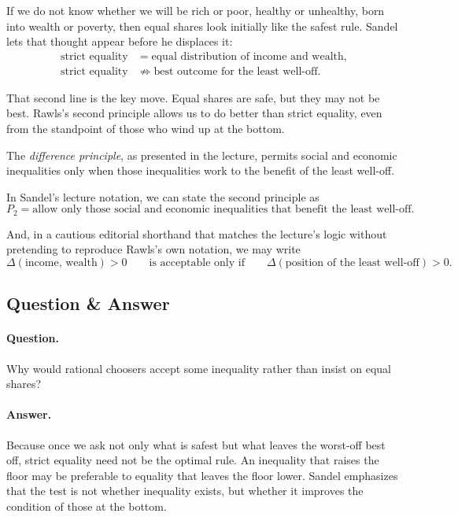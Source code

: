If we do not know whether we will be rich or poor, healthy or unhealthy, born into wealth or poverty, then equal shares look initially like the safest rule. Sandel lets that thought appear before he displaces it:
\begin{align}
\text{strict equality} &= \text{equal distribution of income and wealth},\\
\text{strict equality} &\not\Longrightarrow \text{best outcome for the least well-off}.
\end{align}

That second line is the key move. Equal shares are safe, but they may not be best. Rawls's second principle allows us to do better than strict equality, even from the standpoint of those who wind up at the bottom.

\begin{definition}
The \emph{difference principle}, as presented in the lecture, permits social and economic inequalities only when those inequalities work to the benefit of the least well-off.
\end{definition}

In Sandel's lecture notation, we can state the second principle as
\begin{equation}
P_2=\text{allow only those social and economic inequalities that benefit the least well-off}.
\end{equation}

And, in a cautious editorial shorthand that matches the lecture's logic without pretending to reproduce Rawls's own notation, we may write
\begin{equation}
\Delta(\text{income, wealth})>0
\qquad\text{is acceptable only if}\qquad
\Delta(\text{position of the least well-off})>0.
\end{equation}

\subsection{Question \& Answer}

\paragraph{Question.} Why would rational choosers accept some inequality rather than insist on equal shares?

\paragraph{Answer.} Because once we ask not only what is safest but what leaves the worst-off best off, strict equality need not be the optimal rule. An inequality that raises the floor may be preferable to equality that leaves the floor lower. Sandel emphasizes that the test is not whether inequality exists, but whether it improves the condition of those at the bottom.

